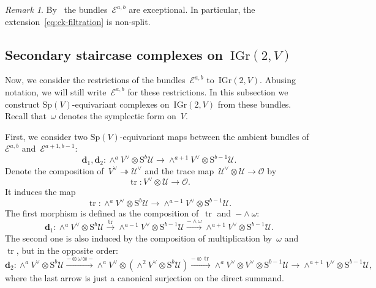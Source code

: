 \documentclass[a4paper]{article}
\newcommand{\Sp}{\mathrm{Sp}}
\newcommand{\IGr}{\mathrm{IGr}}
\newcommand{\cE}{\mathcal{E}}
\newcommand{\cU}{\mathcal{U}}
\newcommand{\Sy}{\mathrm{S}}
\newcommand{\cO}{\mathcal{O}}
\newcommand{\vn}{\mathbf{d}}
\theoremstyle{remark}
\newtheorem{remark}[theorem]{Remark}
\theoremstyle{definition}
\begin{document}
\begin{remark}
	By~\cite[Proposition~3.5]{F15} the bundles~\(\cE^{a,b}\) are exceptional.
	In particular, the extension~\eqref{eq:ck-filtration} is non-split.
\end{remark}


\subsection{Secondary staircase complexes on~\texorpdfstring{\(\IGr(2,V)\)}{IGr(2,V)}}

Now, we consider the restrictions of the bundles~\(\cE^{a,b}\) to~\(\IGr(2,V)\).
Abusing notation, we will still write~\(\cE^{a,b}\) for these restrictions.
In this subsection we construct \(\Sp(V)\)-equivariant complexes on~\(\IGr(2,V)\) from these bundles. 
Recall that~\(\omega\) denotes the symplectic form on~\(V\).

First, we consider two \(\Sp(V)\)-equivariant maps between the ambient bundles of~\(\cE^{a,b}\) and~\(\cE^{a+1,b-1}\):
\begin{equation*}
\vn_1,\vn_2 \colon \wedge^a V^\vee \otimes \Sy^b\cU \to \wedge^{a+1}V^\vee \otimes \Sy^{b-1}\cU.
\end{equation*}
Denote the composition of~\(V^\vee \twoheadrightarrow \cU^\vee\) and the trace map~\(\cU^\vee \otimes \cU \to \cO\) by
\begin{equation*}
	\operatorname{tr} \colon V^\vee \otimes \cU \to \cO.
\end{equation*}
It induces the map 
\begin{equation*}
	\operatorname{tr} \colon \wedge^a V^\vee \otimes \Sy^b\cU \to \wedge^{a-1}V^\vee \otimes \Sy^{b-1}\cU.
\end{equation*}
The first morphism is defined as the composition of~\(\operatorname{tr}\) and~\(- \wedge \omega %
\):
\begin{equation*}
	\vn_1 \colon \wedge^a V^\vee \otimes \Sy^b\cU \xrightarrow{\operatorname{tr}} \wedge^{a-1}V^\vee \otimes \Sy^{b-1}\cU \xrightarrow{- \wedge \omega} \wedge^{a+1}V^\vee \otimes \Sy^{b-1}\cU.
\end{equation*}
The second one is also induced by the composition of multiplication by~\(\omega\) and~\(\operatorname{tr}\), but in the opposite order:
\begin{equation*}
	\vn_2 \colon \wedge^a V^\vee \otimes \Sy^b \cU \xrightarrow{- \otimes \omega \otimes -} \wedge^a V^\vee \otimes \left(\wedge^2 V^\vee \otimes \Sy^{b}\cU\right)
	\xrightarrow{- \otimes \operatorname{tr}}  \wedge^{a} V^\vee \otimes V^\vee \otimes \Sy^{b-1}\cU  \to \wedge^{a+1}V^\vee \otimes \Sy^{b-1}\cU,
\end{equation*}
where the last arrow is just a canonical surjection on the direct summand.
\end{document}

